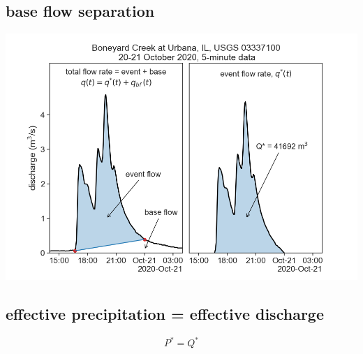 \documentclass[
  letterpaper,
  DIV=11,
  numbers=noendperiod]{scrreprt}
\begin{document}
\hypertarget{base-flow-separation-1}{%
\subsection{base flow separation}\label{base-flow-separation-1}}

\includegraphics{archive/figures/urbana_q_qstar.png}

\hypertarget{effective-precipitation-effective-discharge}{%
\subsection{effective precipitation = effective
discharge}\label{effective-precipitation-effective-discharge}}

\[
P^* = Q^*
\]
\end{document}
